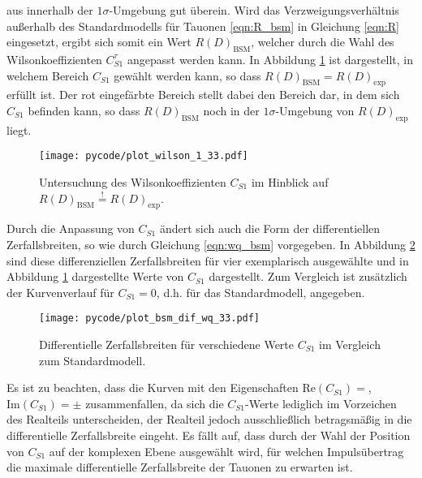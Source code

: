 aus \cite{Hiller2016} innerhalb der $\num{1}\sigma$-Umgebung gut überein.
Wird das Verzweigungsverhältnis außerhalb des Standardmodells für Tauonen \eqref{eqn:R_bsm} in Gleichung \eqref{eqn:R} eingesetzt, ergibt sich somit ein Wert $R(D)_{\text{BSM}}$, welcher durch die Wahl des Wilsonkoeffizienten $C_{S1}^{\tau}$ angepasst werden kann.
In Abbildung \ref{fig:wilson_1} ist dargestellt, in welchem Bereich $C_{S1}$ gewählt werden kann, so dass $R(D)_{\text{BSM}} = R(D)_{\text{exp}}$ erfüllt ist.
Der rot eingefärbte Bereich  stellt dabei den Bereich dar, in dem sich $C_{S1}$ befinden kann, so dass $R(D)_{\text{BSM}}$ noch in der $\num{1}\sigma$-Umgebung von $R(D)_{\text{exp}}$ liegt.
\begin{figure}
  \centering
  \texttt{[image: pycode/plot\_wilson\_1\_33.pdf]}
  \caption{Untersuchung des Wilsonkoeffizienten $C_{S1}$ im Hinblick auf $R(D)_{\text{BSM}} \stackrel{!}{=} R(D)_{\text{exp}}$.}
  \label{fig:wilson_1}
\end{figure}
Durch die Anpassung von $C_{S1}$ ändert sich auch die Form der differentiellen Zerfallsbreiten, so wie durch Gleichung \eqref{eqn:wq_bsm} vorgegeben.
In Abbildung \ref{fig:wilson_2} sind diese differenziellen Zerfallsbreiten für vier exemplarisch ausgewählte und in Abbildung \ref{fig:wilson_1} dargestellte Werte von $C_{S1}$ dargestellt.
Zum Vergleich ist zusätzlich der Kurvenverlauf für $C_{S1} = \num{0}$, d.h. für das Standardmodell, angegeben.
\begin{figure}
  \centering
  \texttt{[image: pycode/plot\_bsm\_dif\_wq\_33.pdf]}
  \caption{Differentielle Zerfallsbreiten für verschiedene Werte $C_{S1}$ im Vergleich zum Standardmodell.}
  \label{fig:wilson_2}
\end{figure}
Es ist zu beachten, dass die Kurven mit den Eigenschaften $\mathrm{Re}(C_{S1}) = $, $\mathrm{Im}(C_{S1}) = \pm$ zusammenfallen, da sich die $C_{S1}$-Werte lediglich im Vorzeichen des Realteils unterscheiden, der Realteil jedoch ausschließlich betragsmäßig in die differentielle Zerfallsbreite eingeht.
Es fällt auf, dass durch der Wahl der Position von $C_{S1}$ auf der komplexen Ebene ausgewählt wird, für welchen Impulsübertrag die maximale differentielle Zerfallsbreite der Tauonen zu erwarten ist.
